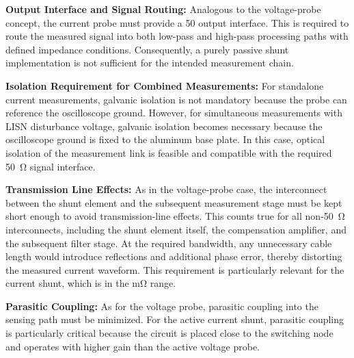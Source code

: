 \textbf{Output Interface and Signal Routing:}
Analogous to the voltage-probe concept, the current probe must provide a \SI{50}{\Omega} output interface.
This is required to route the measured signal into both low-pass and high-pass processing paths with defined impedance conditions.
Consequently, a purely passive shunt implementation is not sufficient for the intended measurement chain.

\textbf{Isolation Requirement for Combined Measurements:}
For standalone current measurements, galvanic isolation is not mandatory because the probe can reference the oscilloscope ground.
However, for simultaneous measurements with LISN disturbance voltage, galvanic isolation becomes necessary because the oscilloscope ground is fixed to the aluminum base plate.
In this case, optical isolation of the measurement link is feasible and compatible with the required \SI{50}{\ohm} signal interface.


\textbf{Transmission Line Effects:}
As in the voltage-probe case, the interconnect between the shunt element and the subsequent measurement stage must be kept short enough to avoid transmission-line effects.
This counts true for all non-\SI{50}{\ohm} interconnects, including the shunt element itself, the compensation amplifier, and the subsequent filter stage.
At the required bandwidth, any unnecessary cable length would introduce reflections and additional phase error, thereby distorting the measured current waveform.
This requirement is particularly relevant for the current shunt, which is in the $\mathrm{m\Omega}$ range.


\textbf{Parasitic Coupling:}
As for the voltage probe, parasitic coupling into the sensing path must be minimized.
For the active current shunt, parasitic coupling is particularly critical because the circuit is placed close to the switching node and operates with higher gain than the active voltage probe.

